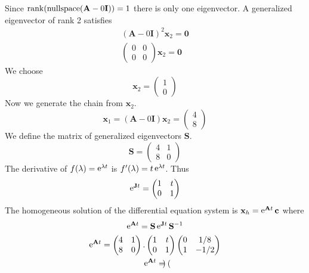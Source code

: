\begin{Example}
  Since $\mathop{\mathrm{rank}}\nolimits(\mathop{\mathrm{nullspace}}\nolimits(\mathbf{A} - 0 \mathbf{I})) = 1$ there is only one eigenvector.  
  A generalized eigenvector of rank 2 satisfies
  \begin{gather*}
    (\mathbf{A} - 0 \mathbf{I})^2 \mathbf{x}_2 = \mathbf{0} \\
    \begin{pmatrix}
      0 & 0 \\
      0 & 0
    \end{pmatrix}
    \mathbf{x}_2 = \mathbf{0} 
  \end{gather*}
  We choose
  \[
  \mathbf{x}_2 = \begin{pmatrix}
    1 \\
    0
  \end{pmatrix}
  \]
  Now we generate the chain from $\mathbf{x}_2$.
  \[
  \mathbf{x}_1 = (\mathbf{A} - 0 \mathbf{I}) \mathbf{x}_2 = 
  \begin{pmatrix}
    4 \\
    8
  \end{pmatrix}
  \]
  We define the matrix of generalized eigenvectors $\mathbf{S}$.
  \[
  \mathbf{S} = \begin{pmatrix}
    4 & 1 \\
    8 & 0
  \end{pmatrix}
  \]
  The derivative of $f(\lambda) = \mathop{\mathrm{e}}\nolimits^{\lambda t}$ is $f'(\lambda) = t \mathop{\mathrm{e}}\nolimits^{\lambda t}$.  Thus
  \[
  \mathop{\mathrm{e}}\nolimits^{\mathbf{J} t} = 
  \begin{pmatrix}
    1 & t \\
    0 & 1
  \end{pmatrix}
  \]
  The homogeneous solution of the differential equation system is
  $\mathbf{x}_h = \mathop{\mathrm{e}}\nolimits^{\mathbf{A} t} \mathbf{c}$ where
  \begin{gather*}
    \mathop{\mathrm{e}}\nolimits^{\mathbf{A} t} = \mathbf{S} \mathop{\mathrm{e}}\nolimits^{\mathbf{J} t} \mathbf{S}^{-1} \\
    \mathop{\mathrm{e}}\nolimits^{\mathbf{A} t} = 
    \begin{pmatrix}
      4 & 1 \\
      8 & 0
    \end{pmatrix}.
    \begin{pmatrix}
      1 & t \\
      0 & 1
    \end{pmatrix}
    \begin{pmatrix}
      0 & 1/8 \\
      1 & -1/2
    \end{pmatrix} \\
    \mathop{\mathrm{e}}\nolimits^{\mathbf{A} t} = 
    \begin{pmatrix}

\end{pmatrix}
\end{gather*}
\end{Example}
